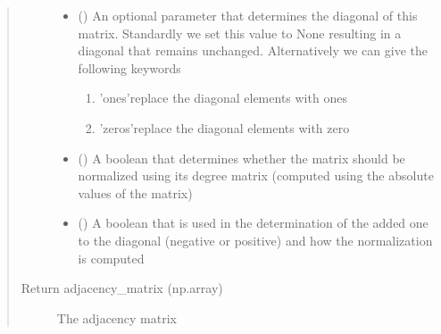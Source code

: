 \documentclass[letterpaper,10pt,english]{sphinxmanual}
\begin{document}
\begin{fulllineitems}
\begin{fulllineitems}
\begin{quote}
\begin{description}
\begin{itemize}
\item {} 
\sphinxstyleliteralstrong{\sphinxupquote{ (}}\sphinxstyleliteralstrong{\sphinxupquote{)}} (\sphinxstyleliteralemphasis{\sphinxupquote{(}}\sphinxstyleliteralemphasis{\sphinxupquote{)}}) \textendash{} 
An optional parameter that determines the diagonal of this matrix. Standardly
we set this value to None resulting in a diagonal that remains unchanged.
Alternatively we can give the following keywords
\begin{enumerate}
%
\item {} 
’ones’\sphinxhyphen{}replace the diagonal elements with ones

\item {} 
’zeros’\sphinxhyphen{}replace the diagonal elements with zero

\end{enumerate}


\item {} 
\sphinxstyleliteralstrong{\sphinxupquote{ (}}\sphinxstyleliteralstrong{\sphinxupquote{)}} (\sphinxstyleliteralemphasis{\sphinxupquote{(}}\sphinxstyleliteralemphasis{\sphinxupquote{)}}) \textendash{} A boolean that determines whether the matrix should be normalized using its
degree matrix (computed using the absolute values of the matrix)

\item {} 
\sphinxstyleliteralstrong{\sphinxupquote{ (}}\sphinxstyleliteralstrong{\sphinxupquote{)}} (\sphinxstyleliteralemphasis{\sphinxupquote{(}}\sphinxstyleliteralemphasis{\sphinxupquote{)}}) \textendash{} A boolean that is used in the determination of the added one to the
diagonal (negative or positive) and how the normalization is
computed

\end{itemize}

\item[{Return adjacency\_matrix (np.array)}] \leavevmode
The adjacency matrix

\end{description}\end{quote}


\end{fulllineitems}
\end{fulllineitems}
\end{document}
